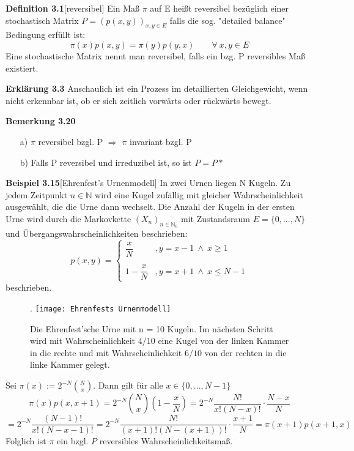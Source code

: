 \textbf{Definition 3.1}[reversibel]
Ein Maß $\pi$ auf E heißt reversibel bezüglich einer stochastisch Matrix $P = (p(x,y))_{x,y \in E}$ falls die sog. "detailed balance" Bedingung erfüllt ist:
\begin{equation*}
\pi(x)p(x,y) = \pi(y)p(y,x) \qquad \forall \: x,y \in E
\end{equation*}
Eine stochastische Matrix nennt man reversibel, falls ein bzg. P reversibles Maß existiert.

\textbf{Erklärung 3.3}
Anschaulich ist ein Prozess im detaillierten Gleichgewicht, wenn nicht erkennbar ist, ob er sich zeitlich vorwärts oder rückwärts bewegt.

\textbf{Bemerkung 3.20}
\mbox{}
\begin{itemize}
\item[a)]  $\pi$ reversibel bzgl. P $\Rightarrow$ $\pi$ invariant bzgl. P
\item[b)] Falls P reversibel und irreduzibel ist, so ist $P = P*$
\end{itemize}

\textbf{Beispiel 3.15}[Ehrenfest's Urnenmodell]
In zwei Urnen liegen N Kugeln. Zu jedem Zeitpunkt $n \in \mathbb{N}$ wird eine Kugel zufällig mit gleicher Wahrscheinlichkeit ausgewählt, die die Urne dann wechselt. Die Anzahl der Kugeln in der ersten Urne wird durch die Markovkette $(X_{n})_{n \in \mathbb{N}_{0}}$ mit Zustandsraum $E = \lbrace 0,...,N \rbrace$ und Übergangswahrscheinlichkeiten beschrieben:
\begin{equation*}
p(x,y)=
\begin{cases}
\dfrac{x}{N} & , y = x - 1 \: \wedge \: x \geq 1\\
 &  \\
1 - \dfrac{x}{N} & , y = x + 1 \: \wedge \: x \leq N - 1
\end{cases}
\end{equation*}
beschrieben.
\begin{figure}[H].
\centering
\texttt{[image: Ehrenfests Urnenmodell]}
\caption{Die Ehrenfest'sche Urne mit n = 10 Kugeln. Im nächsten Schritt wird mit Wahrscheinlichkeit $4/10$ eine Kugel von der linken Kammer in die rechte und mit Wahrscheinlichkeit $6/10$ von der rechten in die linke Kammer gelegt.}
\end{figure}
\noindent
Sei $\pi(x) := 2^{-N} \binom{N}{x}$. Dann gilt für alle $x \in \lbrace 0,...,N-1 \rbrace$
\begin{equation*}
\pi(x)p(x,x+1) =  2^{-N} \binom{N}{x} \left( 1 - \dfrac{x}{N} \right) = 2^{-N} \dfrac{N!}{x!(N-x)!} \cdot \dfrac{N-x}{N}
\end{equation*}
\begin{equation*}
= 2^{-N} \dfrac{(N-1)!}{x!(N-x-1)!} = 2^{-N} \dfrac{N!}{(x+1)!(N-(x+1))! } \cdot \dfrac{x+1}{N} = \pi(x+1)p(x+1,x)
\end{equation*}
Folglich ist $\pi$ ein bzgl. $P$ reversibles Wahrscheinlichkeitsmaß.

